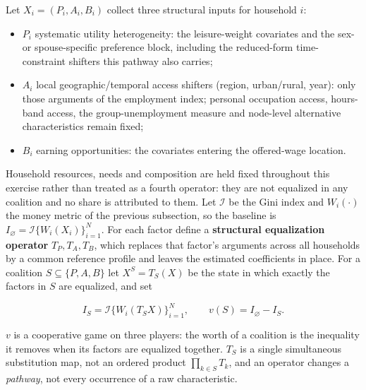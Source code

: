 \documentclass[11pt,a4paper]{article}
\providecommand{\tightlist}{\setlength{\itemsep}{0pt}\setlength{\parskip}{0pt}}
\begin{document}
Let \(X_i=(P_i,A_i,B_i)\) collect three structural inputs for household \(i\):

\begin{itemize}
\tightlist
\item
  \(P_i\) systematic utility heterogeneity: the leisure-weight covariates and the sex- or spouse-specific preference block, including the reduced-form time-constraint shifters this pathway also carries;
\item
  \(A_i\) local geographic/temporal access shifters (region, urban/rural, year): only those arguments of the employment index; personal occupation access, hours-band access, the group-unemployment measure and node-level alternative characteristics remain fixed;
\item
  \(B_i\) earning opportunities: the covariates entering the offered-wage location.
\end{itemize}

Household resources, needs and composition are held fixed throughout this exercise rather than treated as a fourth operator: they are not equalized in any coalition and no share is attributed to them. Let \(\mathcal I\) be the Gini index and \(W_i(\cdot)\) the money metric of the previous subsection, so the baseline is \(I_\varnothing=\mathcal I\{W_i(X_i)\}_{i=1}^N\). For each factor define a \textbf{structural equalization operator} \(T_P,T_A,T_B\), which replaces that factor's arguments across all households by a common reference profile and leaves the estimated coefficients in place. For a coalition \(S\subseteq\{P,A,B\}\) let \(X^S=T_S(X)\) be the state in which exactly the factors in \(S\) are equalized, and set

\[
I_S=\mathcal I\{W_i(T_S X)\}_{i=1}^{N},
\qquad
v(S)=I_\varnothing-I_S .
\]

\(v\) is a cooperative game on three players: the worth of a coalition is the inequality it removes when its factors are equalized together. \(T_S\) is a single simultaneous substitution map, not an ordered product \(\prod_{k\in S}T_k\), and an operator changes a \emph{pathway}, not every occurrence of a raw characteristic.
\end{document}
